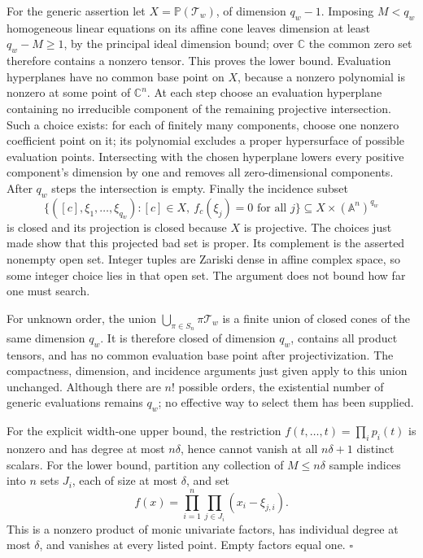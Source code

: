 \documentclass[11pt,a4paper]{article}
\theoremstyle{definition}\newtheorem{definition}{Definition}
\begin{document}
For the generic assertion let $X=\mathbb P(\mathcal T_w)$, of dimension $q_w-1$. Imposing $M<q_w$ homogeneous linear equations on its affine cone leaves dimension at least $q_w-M\ge1$, by the principal ideal dimension bound; over $\mathbb C$ the common zero set therefore contains a nonzero tensor. This proves the lower bound. Evaluation hyperplanes have no common base point on $X$, because a nonzero polynomial is nonzero at some point of $\mathbb C^n$. At each step choose an evaluation hyperplane containing no irreducible component of the remaining projective intersection. Such a choice exists: for each of finitely many components, choose one nonzero coefficient point on it; its polynomial excludes a proper hypersurface of possible evaluation points. Intersecting with the chosen hyperplane lowers every positive component's dimension by one and removes all zero-dimensional components. After $q_w$ steps the intersection is empty. Finally the incidence subset
\[
 \{([c],\xi_1,\ldots,\xi_{q_w}):
      [c]\in X,\ f_c(\xi_j)=0\text{ for all }j\}
 \subseteq X\times(\mathbb A^n)^{q_w}
\]
is closed and its projection is closed because $X$ is projective. The choices just made show that this projected bad set is proper. Its complement is the asserted nonempty open set. Integer tuples are Zariski dense in affine complex space, so some integer choice lies in that open set. The argument does not bound how far one must search.

For unknown order, the union $\bigcup_{\pi\in S_n}\pi\mathcal T_w$ is a finite union of closed cones of the same dimension $q_w$. It is therefore closed of dimension $q_w$, contains all product tensors, and has no common evaluation base point after projectivization. The compactness, dimension, and incidence arguments just given apply to this union unchanged. Although there are $n!$ possible orders, the existential number of generic evaluations remains $q_w$; no effective way to select them has been supplied.

For the explicit width-one upper bound, the restriction
$f(t,\ldots,t)=\prod_i p_i(t)$ is nonzero and has degree at most $n\delta$, hence cannot vanish at all $n\delta+1$ distinct scalars. For the lower bound, partition any collection of $M\le n\delta$ sample indices into $n$ sets $J_i$, each of size at most $\delta$, and set
\[
 f(x)=\prod_{i=1}^n\prod_{j\in J_i}(x_i-\xi_{j,i}).
\]
This is a nonzero product of monic univariate factors, has individual degree at most $\delta$, and vanishes at every listed point. Empty factors equal one. $\square$
\end{document}
